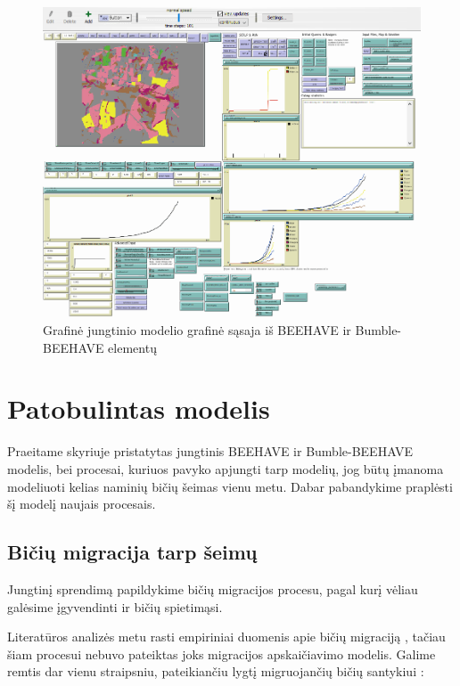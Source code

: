\documentclass{VUMIFPSmagistrinis}
\begin{document}
\begin{figure}[H]
    \centering
    \includegraphics[scale=0.5]{img/new/gui.png}
    \caption{Grafinė jungtinio modelio grafinė sąsaja iš BEEHAVE ir Bumble-BEEHAVE elementų}
    \label{img:gui1}
\end{figure}



\section{Patobulintas modelis}

Praeitame skyriuje pristatytas jungtinis BEEHAVE ir Bumble-BEEHAVE modelis, bei procesai, kuriuos pavyko apjungti tarp modelių, jog būtų įmanoma modeliuoti kelias naminių bičių šeimas vienu metu. Dabar pabandykime praplėsti šį modelį naujais procesais. %




\subsection{Bičių migracija tarp šeimų}
Jungtinį sprendimą papildykime bičių migracijos procesu, pagal kurį vėliau galėsime įgyvendinti ir bičių spietimąsi.

Literatūros analizės metu rasti empiriniai duomenis apie bičių migraciją \cite{PfC98, BPC16}, tačiau šiam procesui nebuvo pateiktas joks migracijos apskaičiavimo modelis. Galime remtis dar vienu straipsniu, pateikiančiu lygtį migruojančių bičių santykiui \cite{FNF15}:
\end{document}
